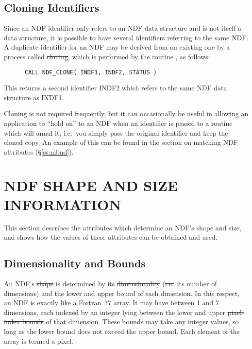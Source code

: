 \subsection{Cloning Identifiers}

Since an NDF identifier only refers to an NDF data structure and is not
itself a data structure, it is possible to have several identifiers
referring to the same NDF. 
A duplicate identifier for an NDF may be derived from an existing one by a
process called \st{cloning}, which is performed by the routine , as
follows:

\small
\begin{verbatim}
      CALL NDF_CLONE( INDF1, INDF2, STATUS )
\end{verbatim}
\normalsize

This returns a second identifier INDF2 which refers to the same NDF data 
structure as INDF1.

Cloning is not required frequently, but it can occasionally be useful in
allowing an application to ``hold on'' to an NDF when an identifier is passed to
a routine which will annul it; \st{i.e.}\ you simply pass the original
identifier and keep the cloned copy.
An example of this can be found in the section on matching NDF attributes 
(\S\ref{ss:mbnd}).


\section{NDF SHAPE AND SIZE INFORMATION}

This section describes the attributes which determine an NDF's shape and
size, and shows how the values of these attributes can be obtained and used.

\subsection{Dimensionality and Bounds}

An NDF's \st{shape\/} is determined by its \st{dimensionality\/}
(\st{i.e.}\ its number of dimensions) and the lower and upper bound of
each 
dimension. 
In this respect, an NDF is exactly like a Fortran~77 array.
It may have between 1 and 7 dimensions, each indexed by an integer lying between
the lower and upper \st{pixel-index bounds\/} of that dimension. 
These bounds may take any integer values, so long as the lower bound does not
exceed the upper bound. 
Each element of the array is termed a \st{pixel}.

